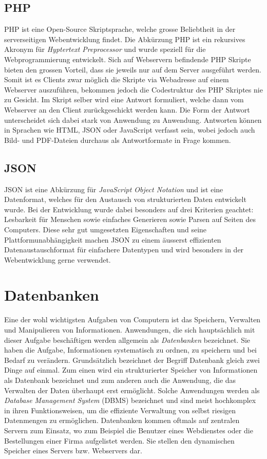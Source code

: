 \documentclass[../main.tex]{subfiles}
\begin{document}
	\subsection{PHP}\label{php}
	PHP ist eine Open-Source Skriptsprache, welche grosse Beliebtheit in der serverseitigen Webentwicklung findet. Die Abkürzung PHP ist ein rekursives Akronym für \emph{Hyptertext Preprocessor} und wurde speziell für die Webprogrammierung entwickelt. Sich auf Webservern befindende PHP Skripte bieten den grossen Vorteil, dass sie jeweils nur auf dem Server ausgeführt werden. Somit ist es Clients zwar möglich die Skripte via Webadresse auf einem Webserver auszuführen, bekommen jedoch die Codestruktur des PHP Skriptes nie zu Gesicht. \cite{PHP} Im Skript selber wird eine Antwort formuliert, welche dann vom Webserver an den Client zurückgeschickt werden kann. Die Form der Antwort unterscheidet sich dabei stark von Anwendung zu Anwendung. Antworten können in Sprachen wie HTML, JSON oder JavaScript verfasst sein, wobei jedoch auch Bild- und PDF-Dateien durchaus als Antwortformate in Frage kommen. \cite{PHP:function}
	
	\subsection{JSON}
	JSON ist eine Abkürzung für \emph{JavaScript Object Notation} und ist eine Datenformat, welches für den Austausch von strukturierten Daten entwickelt wurde. Bei der Entwicklung wurde dabei besonders auf drei Kriterien geachtet: Lesbarkeit für Menschen sowie einfaches Generieren sowie Parsen auf Seiten des Computers. Diese sehr gut umgesetzten Eigenschaften und seine Plattformunabhängigkeit  machen JSON zu einem äusserst effizienten Datenaustauschformat für einfachere Datentypen und wird besonders in der Webentwicklung gerne verwendet. \cite{JSON}
	
	\section{Datenbanken} \label{Datenbanken}
	Eine der wohl wichtigsten Aufgaben von Computern ist das Speichern, Verwalten und Manipulieren von Informationen. Anwendungen, die sich hauptsächlich mit dieser Aufgabe beschäftigen werden allgemein als \emph{Datenbanken} bezeichnet. Sie haben die Aufgabe, Informationen systematisch zu ordnen, zu speichern und bei Bedarf zu verändern. Grundsätzlich bezeichnet der Begriff Datenbank gleich zwei Dinge auf einmal. Zum einen wird ein strukturierter Speicher von Informationen als Datenbank bezeichnet und zum anderen auch die Anwendung, die das Verwalten der Daten überhaupt erst ermöglicht. Solche Anwendungen werden als \emph{Database Management System} (DBMS) bezeichnet und sind meist hochkomplex in ihren Funktionsweisen, um die effiziente Verwaltung von selbst riesigen Datenmengen zu ermöglichen. \cite{IT-Handbuch} Datenbanken kommen oftmals auf zentralen Servern zum Einsatz, wo zum Beispiel die Benutzer eines Webdienstes oder die Bestellungen einer Firma aufgelistet werden. Sie stellen den dynamischen Speicher eines Servers bzw. Webservers dar.
	
\end{document}
